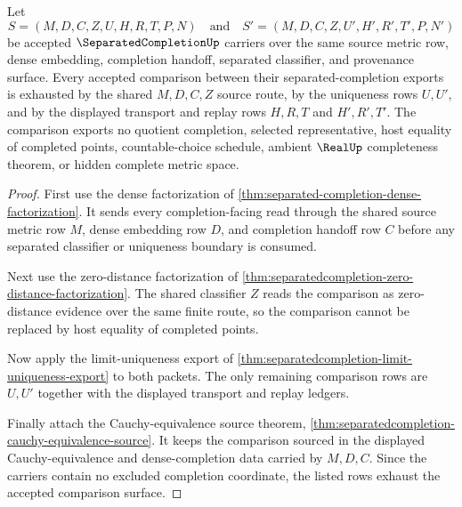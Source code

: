 \begin{theorem}
\label{thm:separatedcompletion-source-comparison-exhaustion}
Let
$$
S=(M,D,C,Z,U,H,R,T,P,N)
\quad\text{and}\quad
S'=(M,D,C,Z,U',H',R',T',P,N')
$$
be accepted $\SeparatedCompletionUp$ carriers over the same source metric row, dense embedding, completion handoff, separated classifier, and provenance surface. Every accepted comparison between their separated-completion exports is exhausted by the shared $M,D,C,Z$ source route, by the uniqueness rows $U,U'$, and by the displayed transport and replay rows $H,R,T$ and $H',R',T'$. The comparison exports no quotient completion, selected representative, host equality of completed points, countable-choice schedule, ambient $\RealUp$ completeness theorem, or hidden complete metric space.
\end{theorem}
\begin{proof}
First use the dense factorization of \autoref{thm:separated-completion-dense-factorization}. It sends every completion-facing read through the shared source metric row $M$, dense embedding row $D$, and completion handoff row $C$ before any separated classifier or uniqueness boundary is consumed.

Next use the zero-distance factorization of \autoref{thm:separatedcompletion-zero-distance-factorization}. The shared classifier $Z$ reads the comparison as zero-distance evidence over the same finite route, so the comparison cannot be replaced by host equality of completed points.

Now apply the limit-uniqueness export of \autoref{thm:separatedcompletion-limit-uniqueness-export} to both packets. The only remaining comparison rows are $U,U'$ together with the displayed transport and replay ledgers.

Finally attach the Cauchy-equivalence source theorem, \autoref{thm:separatedcompletion-cauchy-equivalence-source}. It keeps the comparison sourced in the displayed Cauchy-equivalence and dense-completion data carried by $M,D,C$. Since the carriers contain no excluded completion coordinate, the listed rows exhaust the accepted comparison surface.
\end{proof}

